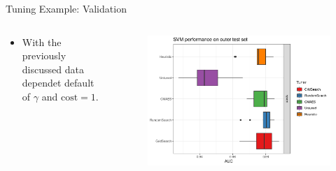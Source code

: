 \begin{frame}{Tuning Example: Validation}

\begin{columns}
\begin{column}{0.4\textwidth}
  \footnotesize

  \begin{itemize}
      \item With the previously discussed data dependet default of $\gamma$ and $\text{cost} = 1$.
  \end{itemize}
\end{column}
\begin{column}{0.6\textwidth}
  \begin{figure}
  \includegraphics[width=\textwidth]{images/benchmark_boxplot_all.png}
  \end{figure}
\end{column}
\end{columns}
\end{frame}
